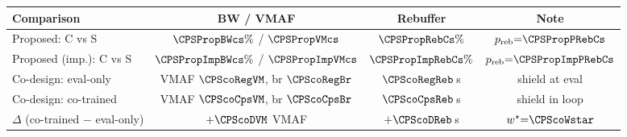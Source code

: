 \begin{tabularx}{\linewidth}{@{}>{\raggedright\arraybackslash}X ccc@{}}
\toprule
\textbf{Comparison} & \textbf{BW / VMAF} & \textbf{Rebuffer} & \textbf{Note} \\
\midrule
Proposed: C vs S & \(\CPSPropBWcs\%\) / \(\CPSPropVMcs\) & \(\CPSPropRebCs\%\) & \(p_{\mathrm{reb}}{=}\CPSPropPRebCs\) \\
Proposed (imp.): C vs S & \(\CPSPropImpBWcs\%\) / \(\CPSPropImpVMcs\) & \(\CPSPropImpRebCs\%\) & \(p_{\mathrm{reb}}{=}\CPSPropImpPRebCs\) \\
\midrule
Co-design: eval-only & VMAF \(\CPScoRegVM\), br \(\CPScoRegBr\) & \(\CPScoRegReb\)\,s & shield at eval \\
Co-design: co-trained & VMAF \(\CPScoCpsVM\), br \(\CPScoCpsBr\) & \(\CPScoCpsReb\)\,s & shield in loop \\
\(\Delta\) (co-trained \(-\) eval-only) & \(+\CPScoDVM\) VMAF & \(+\CPScoDReb\)\,s & \(w^{\star}{=}\CPScoWstar\) \\
\bottomrule
\end{tabularx}
